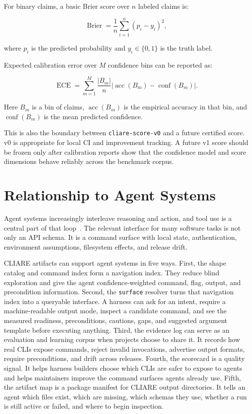 \documentclass[11pt]{article}
\begin{document}
For binary claims, a basic Brier score over \(n\) labeled claims is:

\[
\operatorname{Brier}
  =
  \frac{1}{n}
  \sum_{i=1}^{n}
  (p_i - y_i)^2 ,
\]

where \(p_i\) is the predicted probability and \(y_i \in \{0, 1\}\) is the truth label.

Expected calibration error over \(M\) confidence bins can be reported as:

\[
\operatorname{ECE}
  =
  \sum_{m=1}^{M}
  \frac{|B_m|}{n}
  \left|
    \operatorname{acc}(B_m) - \operatorname{conf}(B_m)
  \right|.
\]

Here \(B_m\) is a bin of claims, \(\operatorname{acc}(B_m)\) is the empirical accuracy in that bin, and \(\operatorname{conf}(B_m)\) is the mean predicted confidence.

This is also the boundary between \texttt{cliare-score-v0} and a future certified score. v0 is appropriate for local CI and improvement tracking. A future v1 score should be frozen only after calibration reports show that the confidence model and score dimensions behave reliably across the benchmark corpus.

\section{Relationship to Agent Systems}

Agent systems increasingly interleave reasoning and action, and tool use is a central part of that loop~\cite{react2022, toolformer2023}. The relevant interface for many software tasks is not only an API schema. It is a command surface with local state, authentication, environment assumptions, filesystem effects, and release drift.

CLIARE artifacts can support agent systems in five ways. First, the shape catalog and command index form a navigation index. They reduce blind exploration and give the agent confidence-weighted command, flag, output, and precondition information. Second, the \texttt{surface} resolver turns that navigation index into a queryable interface. A harness can ask for an intent, require a machine-readable output mode, inspect a candidate command, and see the measured readiness, preconditions, cautions, gaps, and suggested argument template before executing anything. Third, the evidence log can serve as an evaluation and learning corpus when projects choose to share it. It records how real CLIs expose commands, reject invalid invocations, advertise output formats, require preconditions, and drift across releases. Fourth, the scorecard is a quality signal. It helps harness builders choose which CLIs are safer to expose to agents and helps maintainers improve the command surfaces agents already use. Fifth, the artifact map is a package manifest for CLIARE output directories. It tells an agent which files exist, which are missing, which schemas they use, whether a run is still active or failed, and where to begin inspection.
\end{document}
